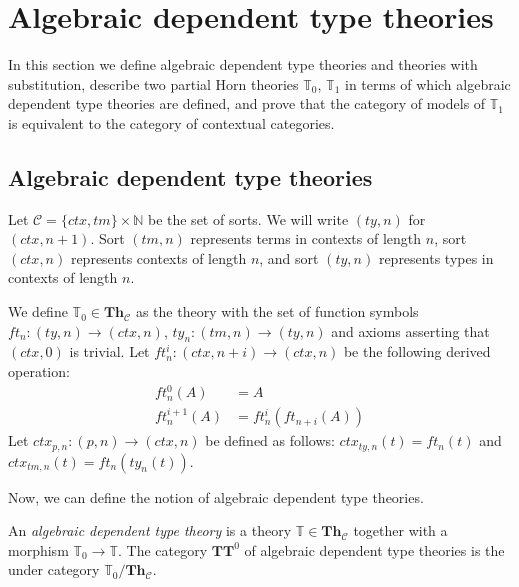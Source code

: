 \documentclass[reqno]{amsart}
\theoremstyle{definition}
\theoremstyle{remark}
\newcommand{\cat}[1]{\mathbf{#1}}
\newcommand{\algtt}{\cat{TT}}
\newcommand{\Th}{\cat{Th}}
\newcommand{\ThC}{\Th_{\mathcal{C}}}
\numberwithin{figure}{section}
\begin{document}
\section{Algebraic dependent type theories}
\label{sec:T1}

In this section we define algebraic dependent type theories and theories with substitution, describe two partial Horn theories $\mathbb{T}_0$, $\mathbb{T}_1$
    in terms of which algebraic dependent type theories are defined, and prove that the category of models of $\mathbb{T}_1$ is equivalent to the category of contextual categories.

\subsection{Algebraic dependent type theories}

Let $\mathcal{C} = \{ ctx, tm \} \times \mathbb{N}$ be the set of sorts.
We will write $(ty,n)$ for $(ctx,n+1)$.
Sort $(tm,n)$ represents terms in contexts of length $n$, sort $(ctx,n)$ represents contexts of length $n$, and sort $(ty,n)$ represents types in contexts of length $n$.

We define $\mathbb{T}_0 \in \ThC$ as the theory with the set of function symbols $ft_n : (ty,n) \to (ctx,n)$, $ty_n : (tm,n) \to (ty,n)$ and axioms asserting that $(ctx,0)$ is trivial.
Let $ft^i_n : (ctx,n+i) \to (ctx,n)$ be the following derived operation:
\begin{align*}
ft^0_n(A) & = A \\
ft^{i+1}_n(A) & = ft^i_n(ft_{n+i}(A))
\end{align*}
Let $ctx_{p,n} : (p,n) \to (ctx,n)$ be defined as follows: $ctx_{ty,n}(t) = ft_n(t)$ and $ctx_{tm,n}(t) = ft_n(ty_n(t))$.

Now, we can define the notion of algebraic dependent type theories.

\begin{defn}
An \emph{algebraic dependent type theory} is a theory $\mathbb{T} \in \ThC$ together with a morphism $\mathbb{T}_0 \to \mathbb{T}$.
The category $\algtt^0$ of algebraic dependent type theories is the under category $\mathbb{T}_0/\ThC$.
\end{defn}
\end{document}

